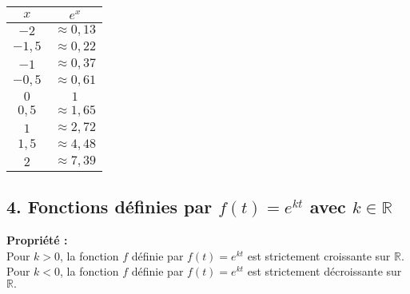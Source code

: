 \documentclass[11pt,a4paper]{article}
\begin{document}
\begin{minipage}{0.2\textwidth}
\begin{tabular}{|c|c|}
    \hline
    $x$ & $e^x$ \\
    \hline
    $-2$ & $\approx0,13$ \\
    \hline
    $-1,5$ & $\approx0,22$ \\
    \hline
    $-1$ & $\approx0,37$ \\
    \hline
    $-0,5$ & $\approx0,61$ \\
    \hline
    $0$ &  $1$ \\
    \hline
    $0,5$ &  $\approx1,65$ \\
    \hline
    $1$ &  $\approx2,72$ \\
    \hline
    $1,5$ &  $\approx4,48$ \\
    \hline
    $2$ & $\approx7,39$ \\
    \hline
\end{tabular}
\end{minipage}
\hfill
\begin{minipage}{0.8\textwidth}
\end{minipage}

\subsection*{4. Fonctions définies par $f(t)=e^{kt}$ avec $k\in\mathbb{R}$}

\begin{mdframed}[style=proprieteStyle]
    \textbf{Propriété :} ~\\
    Pour $k>0$, la fonction $f$ définie par $f(t)=e^{kt}$ est strictement croissante sur $\mathbb{R}.$ \\
    Pour $k<0$, la fonction $f$ définie par $f(t)=e^{kt}$ est strictement décroissante sur $\mathbb{R}.$ 
\end{mdframed}
\end{document}
